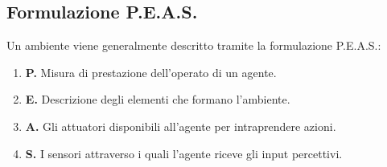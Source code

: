     \subsection{Formulazione P.E.A.S.}
        Un ambiente viene generalmente descritto tramite la formulazione P.E.A.S.:
        \begin{enumerate}
            \item \textbf{P.} Misura di prestazione dell'operato di un agente.
            \item \textbf{E.} Descrizione degli elementi che formano l'ambiente.
            \item \textbf{A.} Gli attuatori disponibili all'agente per intraprendere azioni.
            \item \textbf{S.} I sensori attraverso i quali l'agente riceve gli input percettivi.
        \end{enumerate}
        
